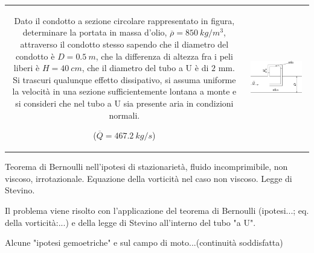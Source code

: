 \noindent
\begin{tabular}{cc}
\begin{minipage}[b]{0.60\textwidth}
\begin{exerciseS}
Dato il condotto a sezione circolare rappresentato in figura, 
determinare la portata in massa d'olio, $\overline{\rho} = 850\ kg/m^3$,
attraverso il condotto stesso sapendo che il diametro del condotto 
\`{e} $D=0.5\ m$, che la differenza di altezza fra i peli liberi 
\`{e} $H=40\ cm$, che il diametro del tubo a U \`{e} di $2$ mm. 
Si trascuri qualunque effetto dissipativo, si assuma
uniforme la velocit\`{a} in una sezione sufficientemente lontana a monte
e si consideri che nel tubo a U sia presente aria in condizioni normali.

($\overline{Q}= 467.2\ kg/s$)
\end{exerciseS}
\end{minipage}
&
\begin{minipage}{0.35\textwidth}
   \begin{center}
   \includegraphics[width=0.90\textwidth]{./fig/condottocircolare.eps}
   \end{center}
\end{minipage}
\end{tabular}

\sol

\partone
 Teorema di Bernoulli nell'ipotesi di stazionarietà, fluido incomprimibile, non viscoso, irrotazionale.
Equazione della vorticità nel caso non viscoso.
Legge di Stevino.

\parttwo
Il problema viene risolto con l'applicazione del teorema di Bernoulli (ipotesi...; eq. della vorticità:...) e della legge di Stevino all'interno del tubo "a U".

Alcune "ipotesi gemoetriche" e sul campo di moto...(continuità soddisfatta)

